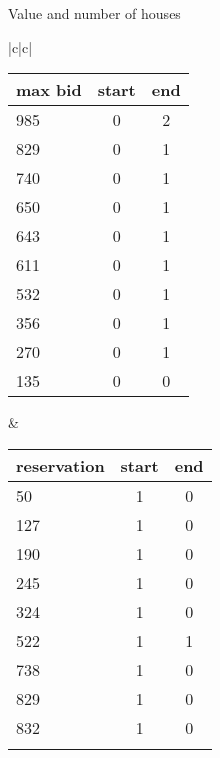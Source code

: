\begin{center}
Value and number of houses

\begin{tabular}{|c|c|}
 
\begin{tabular}{lcc}
max bid&start&end  \\ \hline
985  & 0 & 2 \\
829  & 0 & 1 \\
740  & 0 & 1 \\
650  & 0 & 1 \\
643  & 0 & 1 \\
611  & 0 & 1 \\\hline
532  & 0 & \color{red}1  \\
356  & 0 & \color{red} 1   \\
270  & 0 & \color{red} 1  \\
135  & 0 & 0    \\%
   
\end{tabular}

&
\begin{tabular}{lcc}
reservation&start&end \\ \hline
 50 & 1  & 0 \\
127 & 1  & 0 \\
190 & 1  & 0  \\
245 & 1  & 0 \\
 324 & 1  & 0 \\
 522 & 1 & \color{red} 1\\\hline
 738 & 1  &  \color{blue}0 \\
 829 &1  &  \color{blue}0 \\
832 & 1 & \color{blue}0\\
   &  &              \\%
\end{tabular}

\end{tabular}
\end{center}


